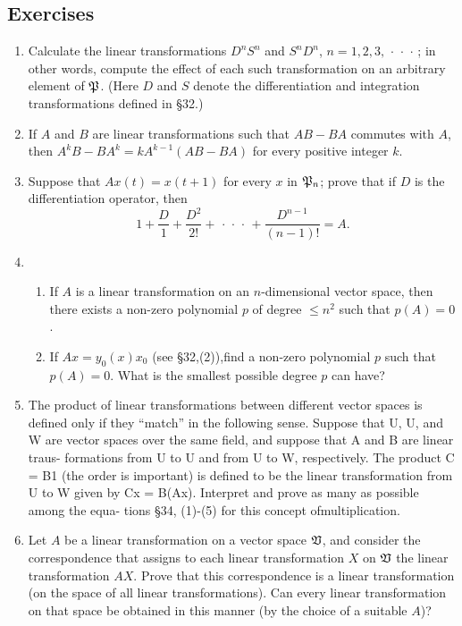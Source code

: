 {\small
\subsection*{Exercises}
\begin{enumerate}[wide]
    \item Calculate the linear transformations \(D^n S^n\) and \(S^n D^n\), \(n
    = 1,2,3,\,\cdot\,\cdot\,\cdot\,\); in other words, compute the effect of each such
    transformation on an arbitrary element of \(\mathfrak{P}\). (Here \(D\) and
    \(S\) denote the differentiation and integration transformations defined in
    §32.)
    \item If \(A\) and \(B\) are linear transformations such that \(AB - BA\)
    commutes with \(A\), then \(A^kB - BA^k = kA^{k-1}(AB - BA)\) for every
    positive integer \(k\).
    \item Suppose that \(Ax(t) = x(t + 1)\) for every \(x\) in \(\mathfrak{P}_n\);
    prove that if \(D\) is the differentiation operator, then
    \begin{equation*}
        1 + \frac{D}{1} + \frac{D^2}{2!} + \,\cdot\,\cdot\,\cdot\, + \frac{D^{n-1}}{(n-1)!} = A.
    \end{equation*}
    \item \begin{enumerate}[nosep, label=(\alph*), wide]
        \item If \(A\) is a linear transformation on an \(n\)-dimensional vector
        space, then there exists a non-zero polynomial \(p\) of degree \(\leq
        n^2\) such that \(p(A) = 0\).
        \item If \(Ax = y_0(x)x_0\) (see §32,(2)),find a non-zero polynomial
        \(p\) such that \(p(A) = 0\). What is the smallest possible degree \(p\)
        can have?
    \end{enumerate}
    \item The product of linear transformations between different vector spaces
    is defined only if they ``match'' in the following sense. Suppose that U, U,
    and W are vector spaces over the same field, and suppose that A and B are
    linear traus- formations from U to U and from U to W, respectively. The
    product C = B1 (the order is important) is defined to be the linear
    transformation from U to W given by Cx = B(Ax). Interpret and prove as many
    as possible among the equa- tions §34, (1)-(5) for this concept
    ofmultiplication.
    \item Let \(A\) be a linear transformation on a vector space \(\mathfrak{V}\), and
    consider the correspondence that assigns to each linear transformation \(X\)
    on \(\mathfrak{V}\) the linear transformation \(AX\). Prove that this
    correspondence is a linear transformation (on the space of all linear
    transformations). Can every linear transformation on that space be obtained
    in this manner (by the choice of a suitable \(A\))?
\end{enumerate}
}

